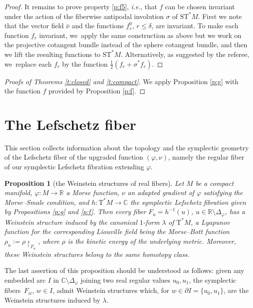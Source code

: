 \documentclass[JEP,XML,SOM,Unicode]{cedram}
\newcommand{\C}{{\mathbb C}}
\newcommand{\R}{{\mathbb R}}
\newcommand{\Discr}{\Delta_\varphi}
\newcommand{\tref}[1]{\textup{\ref{#1}}}
\newcommand{\sT}{\mathrm{T}^\ast}
\newcommand{\sST}{\mathrm{ST}^\ast}
\newcommand{\cnu}{\bar\nu}
\newcommand{\de}{\mathrel{:=}}
\newcommand{\rst}[1]{{\upharpoonright}_{\!#1}}
\let\del\partial
\let\on\colon
\theoremstyle{plain}
\newtheorem{proposition}[theorem]{Proposition}
\theoremstyle{definition}
\begin{document}
\begin{proof}
It remains to prove property \eqref{p:f5}, \emph{i.e.}, that $f$ can be chosen invariant
under the action of the fiberwise antipodal involution $\sigma$ of $\sST M$.
First we note that the vector field $\cnu$ and the functions $f^0_r$, $r \le
\delta$, are invariant. To make each function $f_r$ invariant, we~apply the same
construction as above but we work on the projective cotangent bundle instead of
the sphere cotangent bundle, and then we lift the resulting functions to $\sST
M$. Alternatively, as suggested by the referee, we~replace each $f_r$ by the
function $\tfrac12 (f_r + \sigma^*f_r)$.
\end{proof}

\begin{proof}[Proofs of Theorems \ref{t:closed} and \ref{t:compact}]
We apply Proposition \ref{p:g} with the function $f$ provided by Proposition
\ref{p:f}.
\end{proof}

\section{The Lefschetz fiber} \label{s:lf}

This section collects information about the topology and the symplectic geometry
of the Lefschetz fiber of the upgraded function $(\varphi,\nu)$, namely the
regular fiber of our symplectic Lefschetz fibration extending $\varphi$.

\begin{proposition}[the Weinstein structures of real fibers] \label{p:w}
Let $M$ be a compact manifold, $\varphi \on M \to \R$ a Morse function, $\nu$ an
adapted gradient of $\varphi$ satisfying the Morse--Smale condition, and $h \on
\sT M \to \C$ the symplectic Lefschetz fibration given by Propositions \tref{p:g}
and \tref{p:f}. Then every fiber $F_u = h^{-1}(u)$, $u \in \R \setminus \Discr$, has a
Weinstein structure induced by the canonical $1$-form $\lambda$ of $\sT M$, a
Lyapunov function for the corresponding Liouville field being the Morse--Bott
function $\rho_u \de \rho \rst{ F_u }$, where $\rho$ is the kinetic energy of
the underlying metric. Moreover, these Weinstein structures belong to the same
homotopy class.
\end{proposition}

The last assertion of this proposition should be understood as follows: given any
embedded arc $I$ in $\C \setminus \Discr$ joining two real regular values $u_0, u_1$,
the symplectic fibers~$F_w$, $w \in I$, admit Weinstein structures which, for
$w \in \del I = \{u_0,u_1\}$, are the Weinstein structures induced by $\lambda$.
\end{document}
